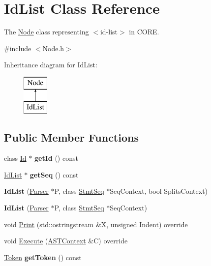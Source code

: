 \hypertarget{class_id_list}{}\section{Id\+List Class Reference}
\label{class_id_list}


The \mbox{\hyperlink{class_node}{Node}} class representing {\ttfamily $<$id-\/list$>$} in C\+O\+RE.  




{\ttfamily \#include $<$Node.\+h$>$}

Inheritance diagram for Id\+List\+:\begin{figure}[H]
\begin{center}
\leavevmode
\includegraphics[height=2.000000cm]{class_id_list}
\end{center}
\end{figure}
\subsection*{Public Member Functions}
\begin{DoxyCompactItemize}
\item 
\mbox{\label{class_id_list_ab2e36d6ae36afd32a08bc89ece87b3dc}} 
class \mbox{\hyperlink{class_id}{Id}} $\ast$ {\bfseries get\+Id} () const
\item 
\mbox{\label{class_id_list_a708dcee9c89e920413beae12e195c4a0}} 
\mbox{\hyperlink{class_id_list}{Id\+List}} $\ast$ {\bfseries get\+Seq} () const
\item 
\mbox{\label{class_id_list_a9e82348d3333f072019cfb6578997761}} 
{\bfseries Id\+List} (\mbox{\hyperlink{class_parser}{Parser}} $\ast$P, class \mbox{\hyperlink{class_stmt_seq}{Stmt\+Seq}} $\ast$Seq\+Context, bool Splits\+Context)
\item 
\mbox{\label{class_id_list_afe57d5b1367faf9a0d7847ec8021b707}} 
{\bfseries Id\+List} (\mbox{\hyperlink{class_parser}{Parser}} $\ast$P, class \mbox{\hyperlink{class_stmt_seq}{Stmt\+Seq}} $\ast$Seq\+Context)
\item 
void \mbox{\hyperlink{class_id_list_a1e2cd3692c956de8cebb88ffcaf0242f}{Print}} (std\+::ostringstream \&X, unsigned Indent) override
\item 
void \mbox{\hyperlink{class_id_list_a9de286be5a5a810ae4cd77df0bd6517f}{Execute}} (\mbox{\hyperlink{class_a_s_t_context}{A\+S\+T\+Context}} \&C) override
\item 
\mbox{\label{class_id_list_ad69fb94447ac5dbff30d0f81e23c49df}} 
\mbox{\hyperlink{class_token}{Token}} {\bfseries get\+Token} () const
\end{DoxyCompactItemize}
